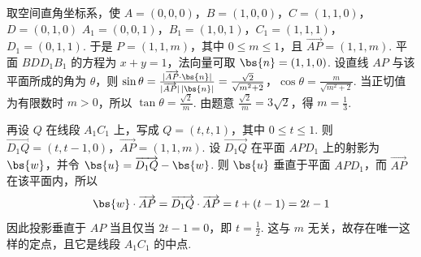 \begin{solution}
取空间直角坐标系，使
\(A=(0,0,0)\)，\(B=(1,0,0)\)，\(C=(1,1,0)\)，\(D=(0,1,0)\)
\(A_{1}=(0,0,1)\)，\(B_{1}=(1,0,1)\)，\(C_{1}=(1,1,1)\)，\(D_{1}=(0,1,1)\).
于是 \(P=(1,1,m)\)，其中 \(0\leqslant m\leqslant1\)，且 \(\overrightarrow{AP}=(1,1,m)\). 平面 \(BDD_{1}B_{1}\) 的方程为 \(x+y=1\)，法向量可取 \(\bs{n}=(1,1,0)\). 设直线 \(AP\) 与该平面所成的角为 \(\theta\)，则
\(\sin\theta=\frac{|\overrightarrow{AP}\cdot\bs{n}|}{|\overrightarrow{AP}|\,|\bs{n}|}=\frac{\sqrt{2}}{\sqrt{m^{2}+2}}\)，\(\cos\theta=\frac{m}{\sqrt{m^{2}+2}}\).
当正切值为有限数时 \(m>0\)，所以 \(\tan\theta=\frac{\sqrt{2}}{m}\). 由题意 \(\frac{\sqrt{2}}{m}=3\sqrt{2}\)，得 \(m=\frac13\).

再设 \(Q\) 在线段 \(A_{1}C_{1}\) 上，写成 \(Q=(t,t,1)\)，其中 \(0\leqslant t\leqslant1\). 则
\(\overrightarrow{D_{1}Q}=(t,t-1,0)\)，\(\overrightarrow{AP}=(1,1,m)\).
设 \(\overrightarrow{D_{1}Q}\) 在平面 \(APD_{1}\) 上的射影为 \(\bs{w}\)，并令 \(\bs{u}=\overrightarrow{D_{1}Q}-\bs{w}\). 则 \(\bs{u}\) 垂直于平面 \(APD_{1}\)，而 \(\overrightarrow{AP}\) 在该平面内，所以
\[
\bs{w}\cdot\overrightarrow{AP}=\overrightarrow{D_{1}Q}\cdot\overrightarrow{AP}=t+(t-1)=2t-1
\]
因此投影垂直于 \(AP\) 当且仅当 \(2t-1=0\)，即 \(t=\frac12\). 这与 \(m\) 无关，故存在唯一这样的定点，且它是线段 \(A_{1}C_{1}\) 的中点.
\end{solution}

